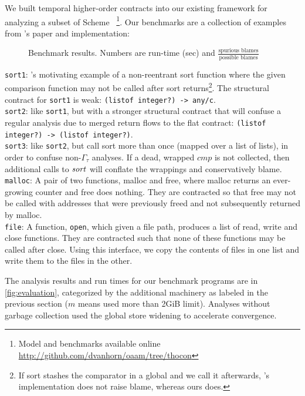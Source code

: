 We built temporal higher-order contracts into our existing framework for analyzing a subset of Scheme~\citep{ianjohnson:oaam:icfp2013} \footnote{Model and benchmarks available online \url{http://github.com/dvanhorn/oaam/tree/thocon}}.
%
Our benchmarks are a collection of examples from \dfm's paper and implementation:
\\
\FloatBarrier
\begin{figure}
  
  \caption{Benchmark results. Numbers are run-time (sec) and $\frac{\text{spurious blames}}{\text{possible blames}}$}
  \label{fig:evaluation}
\end{figure}
\noindent
{\tt sort1}:{ \dfm's motivating example of a non-reentrant sort function where the given comparison function may not be called after sort returns\footnote{If sort stashes the comparator in a global and we call it afterwards, \dfm's implementation does not raise blame, whereas ours does.}.
%
The structural contract for {\tt sort1} is weak: {\tt (listof integer?) -> any/c}.
}
\\
{\tt sort2}: like {\tt sort1}, but with a stronger structural contract that will confuse a regular analysis due to merged return flows to the flat contract: {\tt (listof integer?) -> (listof integer?)}.
\\
{\tt sort3}: like {\tt sort2}, but call sort more than once (mapped over a list of lists), in order to confuse non-$\Gamma_\tau$ analyses. If a dead, wrapped $\mathit{cmp}$ is not collected, then additional calls to $\mathit{sort}$ will conflate the wrappings and conservatively blame.
\\
{\tt malloc}: A pair of two functions, malloc and free, where malloc returns an ever-growing counter and free does nothing. They are contracted so that free may not be called with addresses that were previously freed and not subsequently returned by malloc.
\\
{\tt file}: A function, {\tt open}, which given a file path, produces a list of read, write and close functions. They are contracted such that none of these functions may be called after close. Using this interface, we copy the contents of files in one list and write them to the files in the other.

The analysis results and run times for our benchmark programs are in \autoref{fig:evaluation}, categorized by the additional machinery as labeled in the previous section ($m$ means used more than 2GiB limit).
%
Analyses without garbage collection used the global store widening to accelerate convergence.


